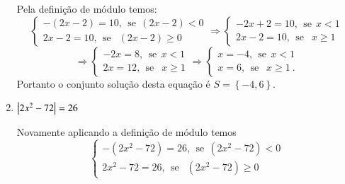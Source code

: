 \begin{exem}
\begin{enumerate}
  Pela definição de módulo temos:
  \[
  \begin{cases}
      -(2x-2)= 10, \ \ \text{se} \ \ (2x-2)<0 \\
      2x-2= 10, \ \ \text{se } \ \ (2x-2) \geq 0
     \end{cases}
     \Rightarrow
     \begin{cases}
      -2x + 2= 10, \ \ \text{se} \ \ x< 1 \\
      2x - 2= 10, \ \ \text{se } \ \ x \geq 1
     \end{cases}
     \]
     \[
     \Rightarrow
     \begin{cases}
      -2x= 8, \ \ \text{se} \ \ x< 1 \\
       2x= 12, \ \ \text{se } \ \ x \geq 1
     \end{cases}
     \Rightarrow
     \begin{cases}
      x= -4, \ \ \text{se} \ \ x< 1 \\
      x= 6, \ \ \text{se } \ \ x \geq 1 \ .
     \end{cases}
  \]
  Portanto o conjunto solução desta equação é $S= \left\{-4, 6 \right\}$.

  \item $\left|2x^2 - 72\right|= 26$

  Novamente aplicando a definição de módulo temos
    \[
    \begin{cases}
      -(2x^2-72)= 26, \ \ \text{se} \ \ (2x^2-72)<0 \\
      2x^2- 72= 26, \ \ \text{se } \ \ (2x^2-72) \geq 0
     \end{cases}
     \]


\end{enumerate}
\end{exem}
